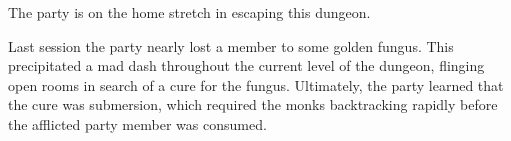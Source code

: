 The party is on the home stretch in escaping this dungeon.

Last session the party nearly lost a member to some golden fungus.
This precipitated a mad dash throughout the current level of the dungeon, flinging open rooms in search of a cure for the fungus.
Ultimately, the party learned that the cure was submersion, which required the monks backtracking rapidly before the afflicted party member was consumed.
